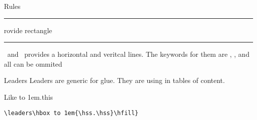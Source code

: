 \begin{frame}{Rules}

\ccol\rule\ provide rectangle 
\ccol\hrule\ and \ccol\vrule\ provides a horizontal and veritcal lines. The keywords for them are , ,  and all can be ommited 
\end{frame}

\begin{frame}[fragile]{Leaders}\relax
     Leaders are generic for glue. They are using in tables of content.
     
     Like \leaders\hbox to 1em{\hss.\hss}\hfill this
     
     \verb|\leaders\hbox to 1em{\hss.\hss}\hfill}|
\end{frame}
